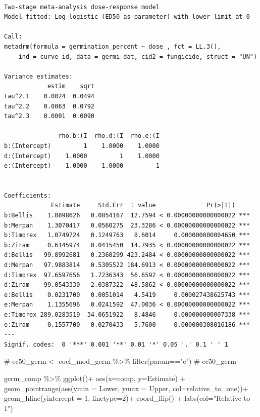 \documentclass[
  letterpaper,
  DIV=11,
  numbers=noendperiod]{scrreport}
\newenvironment{Shaded}{\begin{snugshade}}{\end{snugshade}}
\newcommand{\AttributeTok}[1]{\textcolor[rgb]{0.40,0.45,0.13}{#1}}
\newcommand{\CommentTok}[1]{\textcolor[rgb]{0.37,0.37,0.37}{#1}}
\newcommand{\DecValTok}[1]{\textcolor[rgb]{0.68,0.00,0.00}{#1}}
\newcommand{\FunctionTok}[1]{\textcolor[rgb]{0.28,0.35,0.67}{#1}}
\newcommand{\NormalTok}[1]{\textcolor[rgb]{0.00,0.23,0.31}{#1}}
\newcommand{\SpecialCharTok}[1]{\textcolor[rgb]{0.37,0.37,0.37}{#1}}
\newcommand{\StringTok}[1]{\textcolor[rgb]{0.13,0.47,0.30}{#1}}
\begin{document}
\begin{verbatim}

Two-stage meta-analysis dose-response model
Model fitted: Log-logistic (ED50 as parameter) with lower limit at 0

Call:
metadrm(formula = germination_percent ~ dose_, fct = LL.3(), 
    ind = curve_id, data = germi_dat, cid2 = fungicide, struct = "UN")

Variance estimates:
            estim    sqrt
tau^2.1    0.0024  0.0494
tau^2.2    0.0063  0.0792
tau^2.3    0.0001  0.0090

               rho.b:(I  rho.d:(I  rho.e:(I
b:(Intercept)         1    1.0000    1.0000
d:(Intercept)    1.0000         1    1.0000
e:(Intercept)    1.0000    1.0000         1


Coefficients:
             Estimate     Std.Err  t value              Pr(>|t|)    
b:Bellis    1.0898626   0.0854167  12.7594 < 0.00000000000000022 ***
b:Merpan    1.3070417   0.0560275  23.3286 < 0.00000000000000022 ***
b:Timorex   1.0749724   0.1249763   8.6014     0.000000000004650 ***
b:Ziram     0.6145974   0.0415450  14.7935 < 0.00000000000000022 ***
d:Bellis   99.8992681   0.2360299 423.2484 < 0.00000000000000022 ***
d:Merpan   97.9883814   0.5305522 184.6913 < 0.00000000000000022 ***
d:Timorex  97.6597656   1.7236343  56.6592 < 0.00000000000000022 ***
d:Ziram    99.0543330   2.0387322  48.5862 < 0.00000000000000022 ***
e:Bellis    0.0231700   0.0051014   4.5419     0.000027438625743 ***
e:Merpan    1.1355696   0.0241592  47.0036 < 0.00000000000000022 ***
e:Timorex 289.0283519  34.0651922   8.4846     0.000000000007338 ***
e:Ziram     0.1557700   0.0270433   5.7600     0.000000308016186 ***
---
Signif. codes:  0 '***' 0.001 '**' 0.01 '*' 0.05 '.' 0.1 ' ' 1
\end{verbatim}

\begin{Shaded}
\begin{Highlighting}[]
\CommentTok{\# ec50\_germ \textless{}{-} coef\_mod\_germ \%\textgreater{}\% filter(param=="e") }
\CommentTok{\# ec50\_germ}
\end{Highlighting}
\end{Shaded}

\begin{Shaded}
\begin{Highlighting}[]
\NormalTok{germ\_comp }\SpecialCharTok{\%\textgreater{}\%} 
  \FunctionTok{ggplot}\NormalTok{()}\SpecialCharTok{+} 
  \FunctionTok{aes}\NormalTok{(}\AttributeTok{x=}\NormalTok{comp, }\AttributeTok{y=}\NormalTok{Estimate) }\SpecialCharTok{+} 
  \FunctionTok{geom\_pointrange}\NormalTok{(}\FunctionTok{aes}\NormalTok{(}\AttributeTok{ymin =}\NormalTok{ Lower, }\AttributeTok{ymax =}\NormalTok{ Upper, }\AttributeTok{col=}\NormalTok{relative\_to\_one))}\SpecialCharTok{+}     
  \FunctionTok{geom\_hline}\NormalTok{(}\AttributeTok{yintercept =} \DecValTok{1}\NormalTok{, }\AttributeTok{linetype=}\DecValTok{2}\NormalTok{)}\SpecialCharTok{+}
  \FunctionTok{coord\_flip}\NormalTok{() }\SpecialCharTok{+} 
  \FunctionTok{labs}\NormalTok{(}\AttributeTok{col=}\StringTok{"Relative to 1"}\NormalTok{)}
\end{Highlighting}
\end{Shaded}
\end{document}
